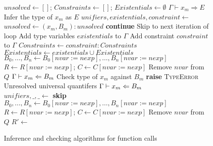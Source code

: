 \begin{figure}[p]
\begin{algorithmic}[1]
  \State $\mathit{unsolved}\gets []$;
  $\mathit{Constraints}\gets []$;
  $\mathit{Existentials}\gets \emptyset$
    \State $\Gamma \vdash x_m \Rightarrow E$
    \Comment Infer the type of $x_m$ as $E$
      \State $\mathit{unifiers}, \mathit{existentials}, \mathit{constraint} \gets$ 
        \State $\mathit{unsolved}\gets (x_m,B_m) : \mathit{unsolved}$
        \State \textbf{continue}
        \Comment Skip to next iteration of loop
        \State Add type variables $\mathit{existentials}$ to $\Gamma$
        \State Add constraint $\mathit{constraint}$ to $\Gamma$
        \State $\mathit{Constraints}\gets \mathit{constraint} : \mathit{Constraints}$
        \State $\mathit{Existentials}\gets \mathit{existentials} \cup \mathit{Existentials}$
      \EndIf
        \State $B_0,...,B_n\gets B_0[\mathit{nvar} := \mathit{nexp}],\ldots,B_n[\mathit{nvar} := \mathit{nexp}]$
        \State $R\gets R[\mathit{nvar} := \mathit{nexp}]$;
        $C\gets C[\mathit{nvar} := \mathit{nexp}]$
        \State Remove $\mathit{nvar}$ from $Q$
      \EndFor
      \State $\Gamma \vdash x_m \Leftarrow B_m$
      \Comment Check type of $x_m$ against $B_m$
    \EndIf
  \EndFor
    \State \textbf{raise} \textsc{TypeError}
    \Comment Unresolved universal quantifers
  \EndIf
  \State {}
    $\Gamma \vdash x_m \Leftarrow B_m$
  \EndFor
  \State \Return {}
  \EndFunction\\

    \State $\mathit{unifiers}, \_, \_ \gets$ 
      \textbf{skip}
    \Else
        \State $B_0,...,B_n\gets B_0[\mathit{nvar} := \mathit{nexp}],\ldots,B_n[\mathit{nvar} := \mathit{nexp}]$
        \State $R\gets R[\mathit{nvar} := \mathit{nexp}]$;
        $C\gets C[\mathit{nvar} := \mathit{nexp}]$
        \State Remove $\mathit{nvar}$ from $Q$
      \EndFor
    \EndIf
  \EndIf
  \State $R'\gets$ 
  \State \Return {}
  \EndFunction
\end{algorithmic}
\label{fig:funapp}
\caption{Inference and checking algorithms for function calls}
\end{figure}
